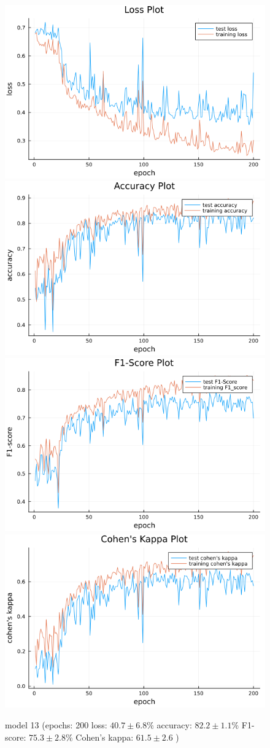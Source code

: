 \documentclass[
a4paper, 
12pt,
grayscalebody, %
abstract=on,
twoside, BCOR10mm, 12pt, DIV13,headinclude, footexclude, final, abstracton, openright
]{ibireprt}
\numberwithin{equation}{chapter}
\numberwithin{table}{chapter}
\numberwithin{figure}{chapter}
\numberwithin{algorithm}{chapter}
\numberwithin{example}{chapter}
\numberwithin{example}{chapter}
\begin{document}
\begin{figure}
	\includegraphics[width=0.4\linewidth]{loss_png_final_run_6_1.png}\hfill
	\includegraphics[width=0.4\linewidth]{accuracy_png_final_run_6_1.png}
	\\[\smallskipamount]
	\includegraphics[width=0.4\linewidth]{f1_score_png_final_run_6_1.png}\hfill
	\includegraphics[width=0.4\linewidth]{cohens_kappa_png_final_run_6_1.png}
	\caption{model 13 (epochs: 200 loss: $40.7\pm6.8\% $ accuracy: $82.2\pm1.1\%$ F1-score: $75.3\pm2.8\%$  Cohen's kappa: $61.5\pm2.6$ )}
\end{figure}
\end{document}
